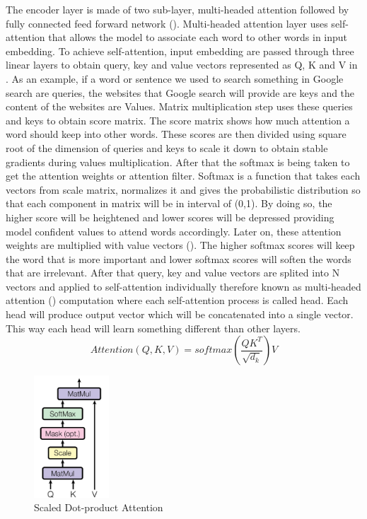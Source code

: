 The encoder layer is made of two sub-layer, multi-headed attention followed by fully connected feed forward network (). Multi-headed attention layer uses self-attention that allows the model to associate each word to other words in input embedding. To achieve self-attention, input embedding are passed through three linear layers to obtain query, key and value vectors represented as Q, K and V in . As an example, if a word or sentence we used to search something in Google search are queries, the websites that Google search will provide are keys and the content of the websites are Values. Matrix multiplication step uses these queries and keys to obtain score matrix. The score matrix shows how much attention a word should keep into other words. These scores are then divided using square root of the dimension of queries and keys to scale it down to obtain stable gradients during values multiplication. After that the softmax is being taken to get the attention weights or attention filter. Softmax is a function that takes each vectors from scale matrix, normalizes it and gives the probabilistic distribution so that each component in matrix will be in interval of (0,1). By doing so, the higher score will be heightened and lower scores will be depressed providing model confident values to attend words accordingly. Later on, these attention weights are multiplied with value vectors (). The higher softmax scores will keep the word that is more important and lower softmax scores will soften the words that are irrelevant. After that query, key and value vectors are splited into N vectors and applied to self-attention individually therefore known as multi-headed attention () computation where each self-attention process is called head. Each head will produce output vector which will be concatenated into a single vector. This way each head will learn something different than other layers. 
\begin{equation}
    Attention(Q,K,V) = softmax\left(\frac{QK^T}{\sqrt{d_k}}\right)V
    \label{eq:Attention}
\end{equation}

\begin{figure}[!ht]
    \centering
    \includegraphics[width=0.25\textwidth]{chapters/images/Transformer/Inside_Attention.JPG}
    \caption{Scaled Dot-product Attention \cite{vaswani2017attention}}
    \label{fig:Scaled_Dot-product_Attention}
\end{figure}

